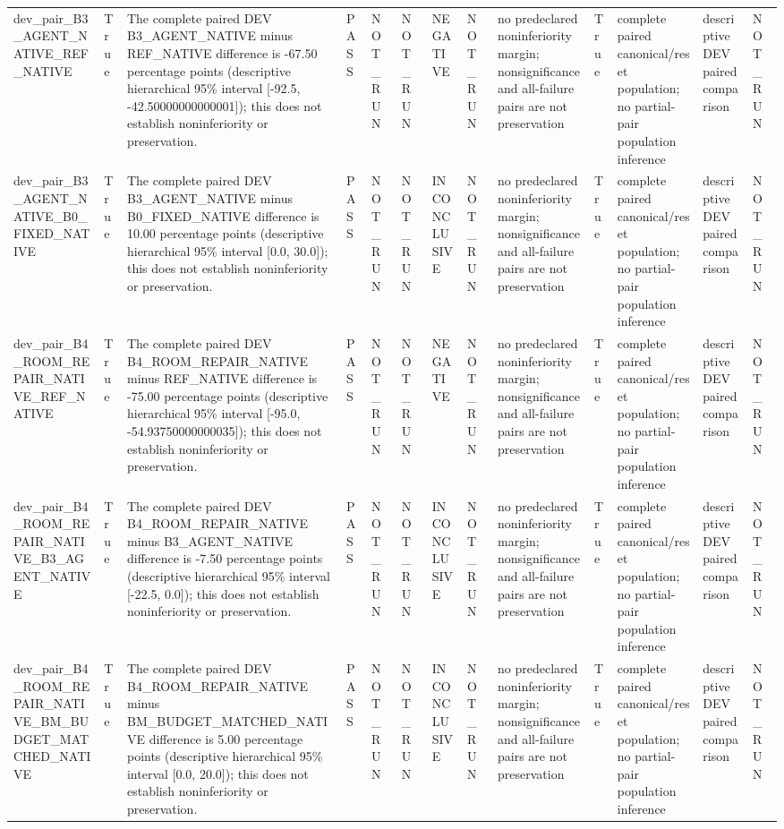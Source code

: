 \begin{tabular}{lllllllllllll}
dev\_pair\_B3\_AGENT\_NATIVE\_REF\_NATIVE & True & The complete paired DEV B3\_AGENT\_NATIVE minus REF\_NATIVE difference is -67.50 percentage points (descriptive hierarchical 95\% interval [-92.5, -42.50000000000001]); this does not establish noninferiority or preservation. & PASS & NOT\_RUN & NOT\_RUN & NEGATIVE & NOT\_RUN & no predeclared noninferiority margin; nonsignificance and all-failure pairs are not preservation & True & complete paired canonical/reset population; no partial-pair population inference & descriptive DEV paired comparison & NOT\_RUN \\
dev\_pair\_B3\_AGENT\_NATIVE\_B0\_FIXED\_NATIVE & True & The complete paired DEV B3\_AGENT\_NATIVE minus B0\_FIXED\_NATIVE difference is 10.00 percentage points (descriptive hierarchical 95\% interval [0.0, 30.0]); this does not establish noninferiority or preservation. & PASS & NOT\_RUN & NOT\_RUN & INCONCLUSIVE & NOT\_RUN & no predeclared noninferiority margin; nonsignificance and all-failure pairs are not preservation & True & complete paired canonical/reset population; no partial-pair population inference & descriptive DEV paired comparison & NOT\_RUN \\
dev\_pair\_B4\_ROOM\_REPAIR\_NATIVE\_REF\_NATIVE & True & The complete paired DEV B4\_ROOM\_REPAIR\_NATIVE minus REF\_NATIVE difference is -75.00 percentage points (descriptive hierarchical 95\% interval [-95.0, -54.93750000000035]); this does not establish noninferiority or preservation. & PASS & NOT\_RUN & NOT\_RUN & NEGATIVE & NOT\_RUN & no predeclared noninferiority margin; nonsignificance and all-failure pairs are not preservation & True & complete paired canonical/reset population; no partial-pair population inference & descriptive DEV paired comparison & NOT\_RUN \\
dev\_pair\_B4\_ROOM\_REPAIR\_NATIVE\_B3\_AGENT\_NATIVE & True & The complete paired DEV B4\_ROOM\_REPAIR\_NATIVE minus B3\_AGENT\_NATIVE difference is -7.50 percentage points (descriptive hierarchical 95\% interval [-22.5, 0.0]); this does not establish noninferiority or preservation. & PASS & NOT\_RUN & NOT\_RUN & INCONCLUSIVE & NOT\_RUN & no predeclared noninferiority margin; nonsignificance and all-failure pairs are not preservation & True & complete paired canonical/reset population; no partial-pair population inference & descriptive DEV paired comparison & NOT\_RUN \\
dev\_pair\_B4\_ROOM\_REPAIR\_NATIVE\_BM\_BUDGET\_MATCHED\_NATIVE & True & The complete paired DEV B4\_ROOM\_REPAIR\_NATIVE minus BM\_BUDGET\_MATCHED\_NATIVE difference is 5.00 percentage points (descriptive hierarchical 95\% interval [0.0, 20.0]); this does not establish noninferiority or preservation. & PASS & NOT\_RUN & NOT\_RUN & INCONCLUSIVE & NOT\_RUN & no predeclared noninferiority margin; nonsignificance and all-failure pairs are not preservation & True & complete paired canonical/reset population; no partial-pair population inference & descriptive DEV paired comparison & NOT\_RUN \\

\end{tabular}
